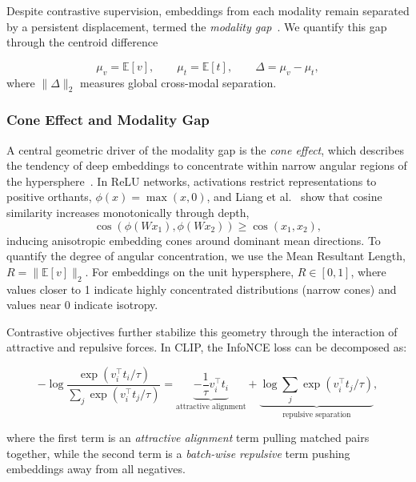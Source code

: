 \documentclass[runningheads]{llncs}
\begin{document}
Despite contrastive supervision, embeddings from each modality remain separated by a persistent displacement, termed the \emph{modality gap}~\cite{liang2022mind}. We quantify this gap through the centroid difference

\begin{equation}
\mu_v=\mathbb{E}[v],
\qquad
\mu_t=\mathbb{E}[t],
\qquad
\Delta=\mu_v-\mu_t,
\label{eq:gap_vector}
\end{equation}
where $\|\Delta\|_2$ measures global cross-modal separation.


\subsubsection{Cone Effect and Modality Gap}
\label{sec:cone_effect}

A central geometric driver of the modality gap is the \emph{cone effect}, which describes the tendency of deep embeddings to concentrate within narrow angular regions of the hypersphere~\cite{liang2022mind}. In ReLU networks, activations restrict representations to positive orthants, $\phi(x)=\max(x,0)$, and Liang et al.~\cite{liang2022mind} show that cosine similarity increases monotonically through depth,
\begin{equation}
\cos(\phi(Wx_1),\phi(Wx_2)) \geq \cos(x_1,x_2),
\label{eq:cone_similarity}
\end{equation}
inducing anisotropic embedding cones around dominant mean directions.
To quantify the degree of angular concentration, we use the Mean Resultant Length, $R = \|\mathbb{E}[v]\|_2$. For embeddings on the unit hypersphere, $R \in [0, 1]$, where values closer to 1 indicate highly concentrated distributions (narrow cones) and values near 0 indicate isotropy.

Contrastive objectives further stabilize this geometry through the interaction of attractive and repulsive forces. 
In CLIP, the InfoNCE loss can be decomposed as:

\begin{equation}
-\log\frac{\exp(v_i^\top t_i/\tau)}
{\sum_{j}\exp(v_i^\top t_j/\tau)}
=
\underbrace{-\frac{1}{\tau}v_i^\top t_i}_{\text{attractive alignment}}
+
\underbrace{\log\sum_{j}\exp(v_i^\top t_j/\tau)}_{\text{repulsive separation}},
\label{eq:clip_attract_repel}
\end{equation}


where the first term is an \emph{attractive alignment} term pulling matched pairs together, while the second term is a \emph{batch-wise repulsive} term pushing embeddings away from all negatives.
\end{document}

